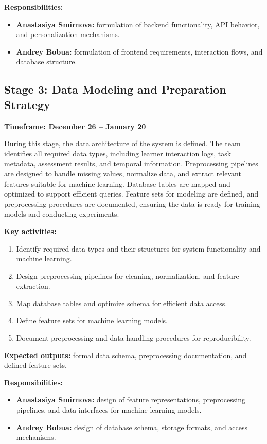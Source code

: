 \documentclass[a4paper,12pt]{extarticle}
\begin{document}
\textbf{Responsibilities:}
\begin{itemize}
    \item \textbf{Anastasiya Smirnova:} formulation of backend functionality, API behavior, and personalization mechanisms.
    \item \textbf{Andrey Bobua:} formulation of frontend requirements, interaction flows, and database structure.
\end{itemize}

\subsection{Stage 3: Data Modeling and Preparation Strategy}
\textbf{Timeframe: December 26 -- January 20}

During this stage, the data architecture of the system is defined. The team identifies all required data types, including learner interaction logs, task metadata, assessment results, and temporal information. Preprocessing pipelines are designed to handle missing values, normalize data, and extract relevant features suitable for machine learning. Database tables are mapped and optimized to support efficient queries. Feature sets for modeling are defined, and preprocessing procedures are documented, ensuring the data is ready for training models and conducting experiments.

\textbf{Key activities:}
\begin{enumerate}
    \item Identify required data types and their structures for system functionality and machine learning.
    \item Design preprocessing pipelines for cleaning, normalization, and feature extraction.
    \item Map database tables and optimize schema for efficient data access.
    \item Define feature sets for machine learning models.
    \item Document preprocessing and data handling procedures for reproducibility.
\end{enumerate}

\textbf{Expected outputs:} formal data schema, preprocessing documentation, and defined feature sets.

\textbf{Responsibilities:}
\begin{itemize}
    \item \textbf{Anastasiya Smirnova:} design of feature representations, preprocessing pipelines, and data interfaces for machine learning models.
    \item \textbf{Andrey Bobua:} design of database schema, storage formats, and access mechanisms.
\end{itemize}
\end{document}
